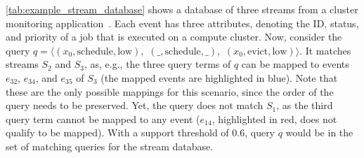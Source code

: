 \autoref{tab:example_stream_database} shows a database
of three streams from a cluster monitoring
application~\cite{reiss2012towards}. Each event has three
attributes, denoting the ID, status, and priority of a job
that is executed on a compute cluster. Now, consider the
query $q = \langle
 (x_0,\text{schedule},\text{low}),$
 $(\_,\text{schedule},\_),$ $(x_0,\text{evict},\text{low})
\rangle$. It matches streams $S_2$ and $S_3$, as, e.g.,
the three query terms of $q$ can be mapped to
events $e_{32}$, $e_{34}$, and $e_{35}$ of
$S_3$ (the mapped events are highlighted in blue). Note that
these are the only possible mappings for this scenario, since
the order of the query needs to be preserved.
Yet, the query does not match $S_1$, as the third query term
cannot be mapped to any event ($e_{14}$, highlighted
in red, does not qualify to be mapped).
With a support threshold of
0.6, query $q$ would be in the set of matching queries for
the stream database.

